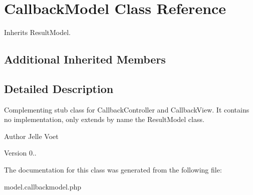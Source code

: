 \hypertarget{class_callback_model}{\section{Callback\-Model Class Reference}
\label{class_callback_model}
}


Inherits Result\-Model.

\subsection*{Additional Inherited Members}


\subsection{Detailed Description}
Complementing stub class for Callback\-Controller and Callback\-View. It contains no implementation, only extends by name the Result\-Model class.

\begin{DoxyAuthor}{Author}
Jelle Voet 
\end{DoxyAuthor}
\begin{DoxyVersion}{Version}
0.. 
\end{DoxyVersion}


The documentation for this class was generated from the following file\-:\begin{DoxyCompactItemize}
\item 
model.\-callbackmodel.\-php\end{DoxyCompactItemize}
